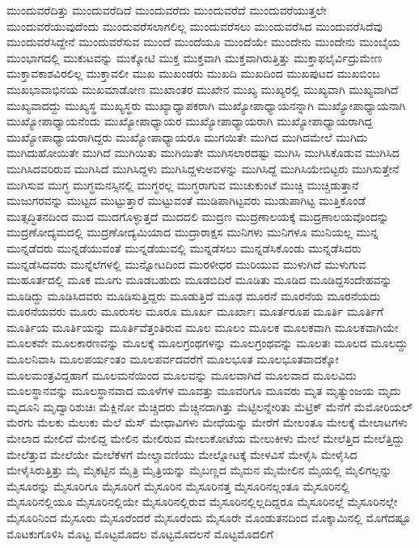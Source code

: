 {ಮುಂದುವರೆದಿತ್ತು
ಮುಂದುವರೆದಿದೆ
ಮುಂದುವರೆದು
ಮುಂದುವರೆದೆ
ಮುಂದುವರೆಯುತ್ತಲೇ
ಮುಂದುವರೆಯುವುದೆಂದು
ಮುಂದುವರೆಸಲಾಗಲಿಲ್ಲ
ಮುಂದುವರೆಸಲು
ಮುಂದುವರೆಸಿದ
ಮುಂದುವರೆಸಿದೆವು
ಮುಂದುವರೆಸಿದ್ದೇನೆ
ಮುಂದುವರೆಸುವ
ಮುಂದೆ
ಮುಂದೆಯೂ
ಮುಂದೆಯೇ
ಮುಂದೇನು
ಮುಂದೇನು
ಮುಂಬೈಯ
ಮುಂಭಾಗದಲ್ಲಿ
ಮುಕುಟವನ್ನು
ಮುಕ್ಕೋಟಿ
ಮುಕ್ತ
ಮುಕ್ತವಾಗಿ
ಮುಕ್ತವಾಗಿರುತ್ತಿತ್ತು
ಮುಕ್ತಾಫಲೈರ್ವಿದ್ರುಮೇಣ
ಮುಕ್ತಾವಕಾಶವಿರಲಿಲ್ಲ
ಮುಕ್ತಾವಲೀ
ಮುಖ
ಮುಖಂಡರು
ಮುಖದಿ
ಮುಖದಿಂದ
ಮುಖಪುಟದ
ಮುಖಬಿಂಬ
ಮುಖಭಾವಾಭಿನಯ
ಮುಖಮಾಡೋಣ
ಮುಖಾಂತರ
ಮುಖೇನ
ಮುಖ್ಯ
ಮುಖ್ಯರಲ್ಲಿ
ಮುಖ್ಯವಾಗಿ
ಮುಖ್ಯವಾಗಿದೆ
ಮುಖ್ಯವಾದದ್ದು
ಮುಖ್ಯಸ್ಥ
ಮುಖ್ಯಸ್ಥರು
ಮುಖ್ಯಾಧ್ಯಾಪಕರಾಗಿ
ಮುಖ್ಯೋಪಾಧ್ಯಾಯನನ್ನಾಗಿ
ಮುಖ್ಯೋಪಾಧ್ಯಾಯನಾಗಿ
ಮುಖ್ಯೋಪಾಧ್ಯಾಯನೆಂದು
ಮುಖ್ಯೋಪಾಧ್ಯಾಯರ
ಮುಖ್ಯೋಪಾಧ್ಯಾಯರಾಗಿ
ಮುಖ್ಯೋಪಾಧ್ಯಾಯರಾಗಿದ್ದ
ಮುಖ್ಯೋಪಾಧ್ಯಾಯರಾಗಿದ್ದರು
ಮುಖ್ಯೋಪಾಧ್ಯಾಯರೂ
ಮುಗಯಿತೇ
ಮುಗಿದ
ಮುಗಿದಮೇಲೆ
ಮುಗಿದು
ಮುಗಿದುಹೋಯಿತೇ
ಮುಗಿದೆ
ಮುಗಿಯಿತು
ಮುಗಿಯಿತೇ
ಮುಗಿಸಲಾರದಷ್ಟು
ಮುಗಿಸಿ
ಮುಗಿಸಿಕೊಡುವ
ಮುಗಿಸಿದ
ಮುಗಿಸಿದವರಿರುವ
ಮುಗಿಸಿದೆ
ಮುಗಿಸಿದ್ದಳು
ಮುಗಿಸಿದ್ದಳುಅವಳನ್ನು
ಮುಗಿಸಿದ್ದೆ
ಮುಗಿಸಿಯೇಬಿಟ್ಟರು
ಮುಗಿಸುತ್ತೇನೆ
ಮುಗಿಸುವ
ಮುಗ್ಧ
ಮುಗ್ಧಮನಸ್ಸಿನಲ್ಲಿ
ಮುಗ್ಧರಲ್ಲ
ಮುಗ್ಧರಾಗುವ
ಮುಚುಕುಂಟೆ
ಮುಚ್ಚಿ
ಮುಚ್ಚಿಡುತ್ತಾನೆ
ಮುಜುಗರವನ್ನು
ಮುಟ್ಟದ
ಮುಟ್ಟುತ್ತಾರೆ
ಮುಟ್ಟುವಂತೆ
ಮುಡಿಪಾಗಿಟ್ಟವರು
ಮುಡುಪಾಗಿಟ್ಟ
ಮುತ್ತಿಕೊಂಡೆ
ಮುತ್ಸದ್ಧಿತನದಿಂದ
ಮುದ
ಮುದಗೊಳ್ಳುತ್ತದೆ
ಮುದದಲಿ
ಮುದ್ರಣ
ಮುದ್ರಣಾಲಯಕ್ಕೆ
ಮುದ್ರಣಾಲಯವೊಂದನ್ನು
ಮುದ್ರಣೋದ್ಯಮದಲ್ಲಿ
ಮುದ್ರಣೋದ್ಯಮಿಯಾದ
ಮುದ್ರಾರಾಕ್ಷಸ
ಮುನಿಗಳು
ಮುನಿಗಳೂ
ಮುನಿಯಲ್ಲ
ಮುನ್ನ
ಮುನ್ನಡೆದರು
ಮುನ್ನಡೆಯುವಂತೆ
ಮುನ್ನಡೆಯುವಲ್ಲಿ
ಮುನ್ನಡೆಸಲು
ಮುನ್ನಡೆಸಿಕೊಂಡು
ಮುನ್ನಡೆಸಿದರು
ಮುನ್ನಡೆಸಿದವರು
ಮುನ್ನೆಲೆಗಳಲ್ಲಿ
ಮುನ್ನೋಟದಿಂದ
ಮುರಳೀಧರ
ಮುರಿಯುವ
ಮುಳುಗಿದೆ
ಮುಳುಗುವ
ಮುಹೂರ್ತದಲ್ಲಿ
ಮೂಕ
ಮೂಗು
ಮೂಡಬಹುದು
ಮೂಡಬಿದಿರೆ
ಮೂಡಿತು
ಮೂಡಿದ
ಮೂಡಿದ್ದಸಂದೇಹವನ್ನು
ಮೂಡಿದ್ದು
ಮೂಡಿಸಿದವರು
ಮೂಡಿಸುತ್ತಿದ್ದರು
ಮೂಡುತ್ತಿದೆ
ಮೂಢ
ಮೂರನೆ
ಮೂರನೆಯ
ಮೂರನೆಯದು
ಮೂರನೆಯವರು
ಮೂರು
ಮೂರುಸಲ
ಮೂರೂ
ಮೂರ್ಖ
ಮೂರ್ಖಾಃ
ಮೂರ್ತರೂಪ
ಮೂರ್ತಿ
ಮೂರ್ತಿಗೆ
ಮೂರ್ತಿಯ
ಮೂರ್ತಿಯನ್ನು
ಮೂರ್ತಿವೆತ್ತಂತಿರುವ
ಮೂಲ
ಮೂಲಂ
ಮೂಲಕ
ಮೂಲಕವಾಗಿ
ಮೂಲಕವಾಗಿಯೇ
ಮೂಲಕವೇ
ಮೂಲಕಾರಣವನ್ನು
ಮೂಲಕ್ಕೆ
ಮೂಲಗ್ರಂಥಗಳನ್ನು
ಮೂಲಗ್ರಂಥವನ್ನು
ಮೂಲತಃ
ಮೂಲದ
ಮೂಲದ್ದು
ಮೂಲನಿವಾಸಿ
ಮೂಲಪರ್ಯಂತಂ
ಮೂಲಪರ್ವದವರೆಗೆ
ಮೂಲಭೂತ
ಮೂಲಭೂತವಾದಕ್ಕೋ
ಮೂಲಮಂತ್ರವಿದ್ದಹಾಗೆ
ಮೂಲಮನೆಯಿಂದ
ಮೂಲವನ್ನು
ಮೂಲವಾಗಿದೆ
ಮೂಲವಾದ
ಮೂಲವಿದು
ಮೂಲಸ್ಥಾನವನ್ನು
ಮೂಲಸ್ಥಾನವಾದ
ಮೂಳೆಗಳ
ಮೂವತ್ತು
ಮೂವರಿಗೂ
ಮೂವರು
ಮೃತ
ಮೃತ್ಯುಂಜಯ
ಮೃದು
ಮೃದೂನಿ
ಮೃದ್ವಾರಿಶುಚಿಃ
ಮೆಕ್ಲಿನೋ
ಮೆಚ್ಚಿದರು
ಮೆಚ್ಚಿನದಾಗಿತ್ತು
ಮೆಟ್ಟಿಲನ್ನೇರಿತು
ಮೆಟ್ರಿಕ್
ಮೆನೆಗೆ
ಮೆಮೋರಿಯಲ್
ಮೆರಗು
ಮೆಲಕು
ಮೆಲುಕು
ಮೆಲೆ
ಮೆಸ್
ಮೇಧಾವಿಗಳು
ಮೇಧೆಯನ್ನು
ಮೇರೆಗೆ
ಮೇಲಂತೂ
ಮೇಲಕ್ಕೆ
ಮೇಲಾಟಗಳು
ಮೇಲಾದ
ಮೇಲಿದೆ
ಮೇಲಿದ್ದ
ಮೇಲಿನ
ಮೇಲಿರುವ
ಮೇಲುಕೋಟೆಯ
ಮೇಲುಕೀಳು
ಮೇಲೆ
ಮೇಲೆತ್ತಿದ
ಮೇಲೆತ್ತಿದ್ದು
ಮೇಲೆತ್ತುವ
ಮೇಲೆಯೇ
ಮೇಲೆಕೆಳಗೆ
ಮೇಲ್ಚಾವಣಿಯು
ಮೇಲ್ನೋಟಕ್ಕೆ
ಮೇಳವಿಸೆ
ಮೇಳೈಸಿ
ಮೇಳೈಸಿದ
ಮೇಳೈಸಿರುತ್ತಿತ್ತು
ಮೈ
ಮೈಕಟ್ಟಿನ
ಮೈತ್ರಿ
ಮೈತ್ರಿಯನ್ನು
ಮೈಬಣ್ಣದ
ಮೈಮನ
ಮೈಮೇಲಿನ
ಮೈಯಲ್ಲಿ
ಮೈಲಿಗಲ್ಲನ್ನು
ಮೈಸೂರನ್ನು
ಮೈಸೂರಿಗೂ
ಮೈಸೂರಿಗೆ
ಮೈಸೂರಿನ
ಮೈಸೂರಿನತ್ತ
ಮೈಸೂರಿನಲ್ಲಂತೂ
ಮೈಸೂರಿನಲ್ಲಿ
ಮೈಸೂರಿನಲ್ಲಿಯೂ
ಮೈಸೂರಿನಲ್ಲಿಯೇ
ಮೈಸೂರಿನಲ್ಲಿರುವ
ಮೈಸೂರಿನಲ್ಲಿಲ್ಲದಿದ್ದರೂ
ಮೈಸೂರಿನಲ್ಲೆ
ಮೈಸೂರಿನಲ್ಲೇ
ಮೈಸೂರಿನಿಂದ
ಮೈಸೂರು				
ಮೈಸೂರೆಂದರೆ
ಮೈಸೂರೆಂದು
ಮೈಸೂರೇ
ಮೊಂಡುತನದಿಂದ
ಮೊಕ್ಕಾಮಿನಲ್ಲಿ
ಮೊಗೆದಷ್ಟೂ
ಮೊಟಕುಗೊಳಿಸಿ
ಮೊಟ್ಟ
ಮೊಟ್ಟಮೊದಲ
ಮೊಟ್ಟಮೊದಲನೆ
ಮೊಟ್ಟಮೊದಲಿಗೆ
}
